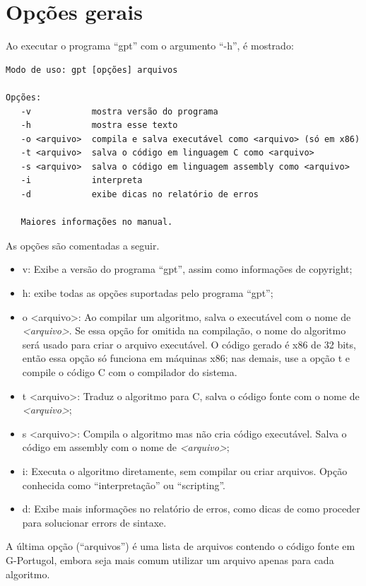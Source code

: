 \documentclass[a4paper,11pt]{report}
\begin{document}
\section{Opções gerais}
\label{sec:opcoes_gerais}

Ao executar o programa ``gpt'' com o argumento ``-h'', é mostrado:

\begin{verbatim}
Modo de uso: gpt [opções] arquivos

Opções:
   -v            mostra versão do programa
   -h            mostra esse texto
   -o <arquivo>  compila e salva executável como <arquivo> (só em x86)
   -t <arquivo>  salva o código em linguagem C como <arquivo>
   -s <arquivo>  salva o código em linguagem assembly como <arquivo>
   -i            interpreta
   -d            exibe dicas no relatório de erros

   Maiores informações no manual.
\end{verbatim}

As opções são comentadas a seguir.

\begin{itemize}
  \item v: Exibe a versão do programa ``gpt'', assim como informações de
    copyright;
  \item h: exibe todas as opções suportadas pelo programa ``gpt'';
  \item o <arquivo>: Ao compilar um algoritmo, salva o executável com o nome de
    \textit{<arquivo>}. Se essa opção for omitida na compilação, o nome do
    algoritmo será usado para criar o arquivo executável. O código gerado é
    x86 de 32 bits, então essa opção só funciona em máquinas x86; nas demais,
    use a opção t e compile o código C com o compilador do sistema.
  \item t <arquivo>: Traduz o algoritmo para C, salva o código fonte com o nome
    de \textit{<arquivo>};
  \item s <arquivo>: Compila o algoritmo mas não cria código executável. Salva o
    código em assembly com o nome de \textit{<arquivo>};
  \item i: Executa o algoritmo diretamente, sem compilar ou criar arquivos. Opção
    conhecida como ``interpretação'' ou ``scripting''.
  \item d: Exibe mais informações no relatório de erros, como dicas de como
    proceder para solucionar errors de sintaxe.
\end{itemize}

A última opção (``arquivos'') é uma lista de arquivos contendo o código fonte em
G-Portugol, embora seja mais comum utilizar um arquivo apenas para cada
algoritmo.
\end{document}

